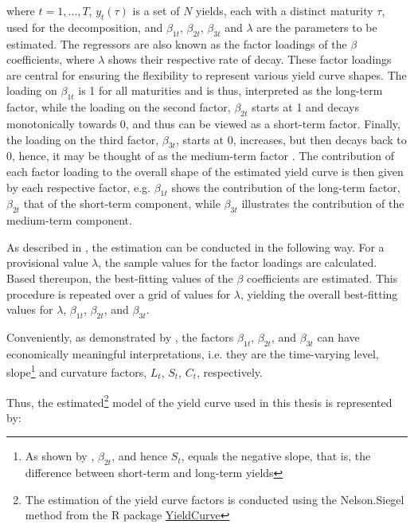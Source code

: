where $t=1,\ldots, T$, $y_{t}(\tau)$ is a set of $N$ yields, each with a distinct maturity $\tau$, used for the decomposition, and $\beta_{1t}$, $\beta_{2t}$, $\beta_{3t}$ and $\lambda$ are the parameters to be estimated. 
The regressors are also known as the factor loadings of the $\beta$ coefficients, where $\lambda$ shows their respective rate of decay. 
These factor loadings are central for ensuring the flexibility to represent various yield curve shapes. 
The loading on $\beta_{1t}$ is 1 for all maturities and is thus, interpreted as the long-term factor, while the loading on the second factor, $\beta_{2t}$ starts at 1 and decays monotonically towards 0, and thus can be viewed as a short-term factor. Finally, the loading on the third factor, $\beta_{3t}$, starts at 0, increases, but then decays back to 0, hence, it may be thought of as the medium-term factor \citep{diebold2006forecasting}. The contribution of each factor loading to the overall shape of the estimated yield curve is then given by each respective factor, e.g. $\beta_{1t}$ shows the contribution of the long-term factor, $\beta_{2t}$ that of the short-term component, while $\beta_{3t}$ illustrates the contribution of the medium-term component\citep{nelson1987parsimonious}. 

As described in \citet{nelson1987parsimonious}, the estimation can be conducted in the following way. For a provisional value $\lambda$, the sample values for the factor loadings are calculated. Based thereupon, the best-fitting values of the $\beta$ coefficients are estimated. This procedure is repeated over a grid of values for $\lambda$, yielding the overall best-fitting values for $\lambda$, $\beta_{1t}$, $\beta_{2t}$, and $\beta_{3t}$. 

Conveniently, as demonstrated by \citet{diebold2006forecasting}, the factors $\beta_{1t}$, $\beta_{2t}$, and $\beta_{3t}$ can have economically meaningful interpretations, i.e. they are the time-varying level, slope\footnote{As shown by \citet{diebold2006forecasting}, $\beta_{2t}$, and hence $S_{t}$, equals the negative slope, that is, the difference between short-term and long-term yields} and curvature factors, $L_{t}$, $S_{t}$, $C_{t}$, respectively.


Thus, the estimated\footnote{The estimation of the yield curve factors is conducted using the Nelson.Siegel method from the R package \href{https://cran.r-project.org/web/packages/YieldCurve/index.html}{YieldCurve}} model of the yield curve used in this thesis is represented by:

